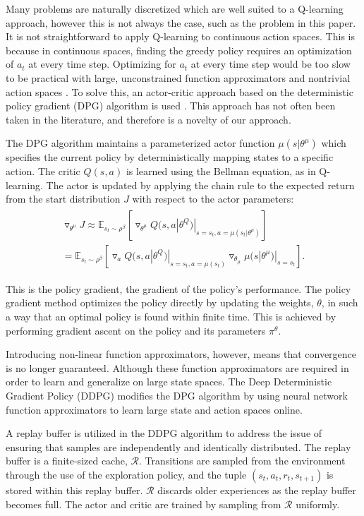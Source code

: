 \documentclass[conference]{IEEEtran}
\begin{document}
Many problems are naturally discretized which are well suited to a Q-learning approach, however this is not always the case, such as the problem in this paper. It is not straightforward to apply Q-learning to continuous action spaces. This is because in continuous spaces, finding the greedy policy requires an optimization of $a_t$ at every time step. Optimizing for $a_t$ at every time step would be too slow to be practical with large, unconstrained function approximators and nontrivial action spaces \cite{Hunt2016a}. To solve this, an actor-critic approach based on the deterministic policy gradient (DPG) algorithm is used \cite{Silver2014}. This approach has not often been taken in the literature, and therefore is a novelty of our approach.


The DPG algorithm maintains a parameterized actor function $\mu(s|\theta^\mu)$ which specifies the current policy by deterministically mapping states to a specific action. The critic $Q(s,a)$ is learned using the Bellman equation, as in Q-learning. The actor is updated by applying the chain rule to the expected return from the start distribution $J$ with respect to the actor parameters:
\begin{align}
\begin{split}
	\triangledown_{\theta^\mu}J\approx\mathbb{E}_{s_t\sim\rho^\beta}[\triangledown_{\theta^\mu}Q(s,a|\theta^Q)|_{s=s_t,a=\mu(s_t|\theta^\mu)}] \\
	= \mathbb{E}_{s_t\sim\rho^\beta}[\triangledown_aQ(s,a|\theta^Q)|_{s=s_t,a=\mu(s_t)}\triangledown_{\theta_\mu}\mu(s|\theta^\mu)|_{s=s_t}].
\end{split}
\end{align}
 
This is the policy gradient, the gradient of the policy's performance. The policy gradient method optimizes the policy directly by updating the weights, $\theta$, in such a way that an optimal policy is found within finite time. This is achieved by performing gradient ascent on the policy and its parameters $\pi^\theta$.

Introducing non-linear function approximators, however, means that convergence is no longer guaranteed. Although these function approximators are required in order to learn and generalize on large state spaces. The Deep Deterministic Gradient Policy (DDPG) modifies the DPG algorithm by using neural network function approximators to learn large state and action spaces online.

A replay buffer is utilized in the DDPG algorithm to address the issue of ensuring that samples are independently and identically distributed. The replay buffer is a finite-sized cache, $\mathcal{R}$. Transitions are sampled from the environment through the use of the exploration policy, and the tuple $(s_t,a_t,r_t,s_{t+1})$ is stored within this replay buffer. $\mathcal{R}$ discards older experiences as the replay buffer becomes full. The actor and critic are trained by sampling from $\mathcal{R}$ uniformly. 
\end{document}
